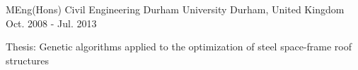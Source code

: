 

\begin{cventries}

  \cventry
    {MEng(Hons) Civil Engineering} %
    {Durham University} %
    {Durham, United Kingdom} %
    {Oct. 2008 - Jul. 2013} %
    {
      \begin{cvitems} %
        \item {Thesis: Genetic algorithms applied to the optimization of steel space-frame roof structures}
      \end{cvitems}
    }

\end{cventries}
